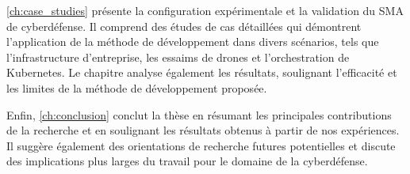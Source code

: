 \autoref{ch:case_studies} présente la configuration expérimentale et la validation du SMA de cyberdéfense. Il comprend des études de cas détaillées qui démontrent l'application de la méthode de développement dans divers scénarios, tels que l'infrastructure d'entreprise, les essaims de drones et l'orchestration de Kubernetes. Le chapitre analyse également les résultats, soulignant l'efficacité et les limites de la méthode de développement proposée.

Enfin, \autoref{ch:conclusion} conclut la thèse en résumant les principales contributions de la recherche et en soulignant les résultats obtenus à partir de nos expériences. Il suggère également des orientations de recherche futures potentielles et discute des implications plus larges du travail pour le domaine de la cyberdéfense.





